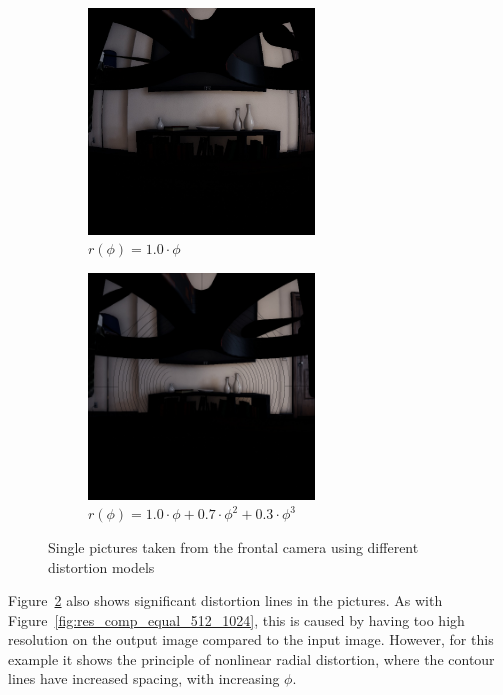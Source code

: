 \begin{figure}[!htb]
    \centering
    \begin{subfigure}{0.45\textwidth}
        \centering
        \includegraphics[height=6cm]{rapport/fig/Results/single/single_equi_distort_noline.jpeg}
        \caption{$r(\phi) = 1.0 \cdot \phi$}
        \label{fig:res_different_distortion_k1}
    \end{subfigure}
    \begin{subfigure}{0.45\textwidth}
        \centering
        \includegraphics[height=6cm]{rapport/fig/Results/single/single_k2_distort.jpeg}
        \caption{$r(\phi) = 1.0 \cdot \phi + 0.7 \cdot \phi^2 + 0.3 \cdot \phi^3$}
        \label{fig:res_different_distortion_k1k2k3}
    \end{subfigure}
    \caption{Single pictures taken from the frontal camera using different distortion models}
    \label{fig:res_different_distortions}
\end{figure}

Figure~\ref{fig:res_different_distortion_k1k2k3} also shows significant distortion lines in the pictures. As with Figure~\ref{fig:res_comp_equal_512_1024}, this is caused by having too high resolution on the output image compared to the input image. However, for this example it shows the principle of nonlinear radial distortion, where the contour lines have increased spacing, with increasing $\phi$.

